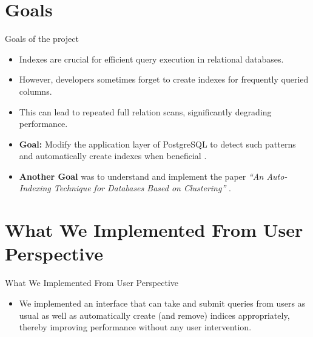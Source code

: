 \documentclass[Serif, 10pt, brown]{beamer}
\theoremstyle{example}
\theoremstyle{plain}
\begin{document}


\section{Goals}
\begin{frame}{Goals of the project}
	\begin{itemize}
		\item Indexes are crucial for efficient query execution in relational databases.
		\item However, developers sometimes forget to create indexes for frequently queried columns.
		\item This can lead to repeated full relation scans, significantly degrading performance.
		\item {\bf Goal:} Modify the application layer of PostgreSQL to detect such patterns and automatically create indexes when beneficial \cite{nagesh2023indexes}.
		\item {\bf Another Goal} was to understand and implement the paper \textit{``An Auto-Indexing Technique for Databases Based on Clustering''} \cite{1333569}.
	\end{itemize}
\end{frame}

\section{What We Implemented From User Perspective}
\begin{frame}{What We Implemented From User Perspective}
	\begin{itemize}
		\item We implemented an interface that can take and submit queries from users as usual as well as automatically create (and remove) indices appropriately, thereby improving performance without any user intervention.
	\end{itemize}
\end{frame}
\end{document}
